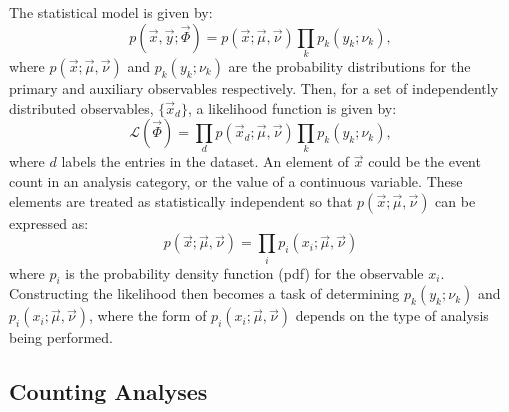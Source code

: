 The statistical model is given by:
\begin{equation}
  p(\vec{x},\vec{y};\vec{\Phi}) = p(\vec{x};\vec{\mu},\vec{\nu}) \prod_k p_k(y_k;\nu_k), 
  \label{eq:statistical_model}
\end{equation}
where $p(\vec{x};\vec{\mu},\vec{\nu})$ and $p_k(y_k;\nu_k)$ are the probability distributions for the primary and auxiliary observables respectively. Then, for a set of independently distributed observables, $\{\vec{x}_d\}$, a likelihood function is given by:
\begin{equation}
  \mathcal{L}(\vec{\Phi}) = \prod_d p(\vec{x}_d;\vec{\mu},\vec{\nu}) \prod_k p_k(y_k;\nu_k),
  \label{eq:general_likelihood}
\end{equation}
where $d$ labels the entries in the dataset. An element of $\vec{x}$ could be the event count in an analysis category, or the value of a continuous variable. These elements are treated as statistically independent so that $p(\vec{x};\vec{\mu},\vec{\nu})$ can be expressed as:
\begin{equation}
  p(\vec{x};\vec{\mu},\vec{\nu}) = \prod_i p_i(x_i;\vec{\mu},\vec{\nu})
\end{equation}
where $p_i$ is the probability density function (pdf) for the observable $x_i$. Constructing the likelihood then becomes a task of determining $p_k(y_k;\nu_k)$ and $p_i(x_i;\vec{\mu},\vec{\nu})$, where the form of $p_i(x_i;\vec{\mu},\vec{\nu})$ depends on the type of analysis being performed.

\subsection{Counting Analyses}\label{sec:stats_counting_analysis}

